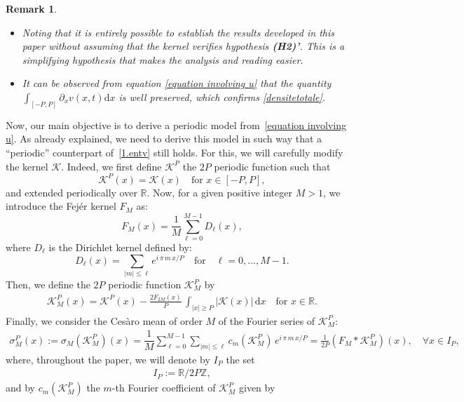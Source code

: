 \documentclass[11pt]{amsart}
\newtheorem{remark}{Remark}
\newcommand{\K}{\mathcal{K}}
\newcommand{\dd}{\mathrm{d}}
\newcommand{\R}{\mathbb{R}}
\newcommand{\Z}{\mathbb{Z}}
\begin{document}
\begin{remark}{$\;$}

\begin{itemize}
\item Noting that it is entirely possible to establish the results developed in this paper without assuming that the kernel verifies hypothesis {\textbf{(H2)'}}. This is a simplifying hypothesis that makes the analysis and reading easier.
\item  It can be observed from equation \eqref{equation involving u} 
 that the quantity $\int_{[-P,P]}  \partial_x v(x,t) \dd x$  is well preserved, 
which confirms  \eqref{densitetotale}.
\end{itemize}
\end{remark}
Now, our main objective is to derive a periodic model from~\eqref{equation involving u}. As already explained, we need to derive this model in such way that a ``periodic'' counterpart of~\eqref{1.entv} still holds. For this, we will carefully modify the kernel $\K$. Indeed, we first define $\K^P$ the $2P$ periodic function such that 
\[
\K^P(x) = \K(x) \quad \mbox{for }x \in [-P,P],
\]
and extended periodically over $\R$. Now, for a given positive integer $M>1$, 
we introduce  the Fej\'er kernel $F_M$ as: 
 \begin{equation}\label{Fejer kernel}
      F_M(x)= \frac{1}{M} \sum_{\ell = 0}^{M - 1}  D_{\ell}(x),  
  \end{equation}
 where $D_\ell$ is the Dirichlet  kernel  defined by: 
   $$
 D_\ell(x)=  \sum_{|m|\leq \ell} e^{i \,\pi \, m \,x/P}
      \quad\mbox{for} \quad    \ell = 0, \ldots, M-1.
 $$
Then, we define the $2P$ periodic function $\K^P_M$ by
\begin{align}\label{1.defKP}
    \K^P_M(x) = \K^P(x) - \frac{2F_{2M}(x)}{P} \, \int_{|x|\geq P} \left|\K(x)\right| \, \dd x \quad \mbox{for }x \in \R. 
\end{align}
Finally, we consider the  Ces\`aro mean of order $M$ 
 of the Fourier series of $\K^P_M$:
 \begin{align}\label{cesaro}
     \sigma_M^P(x) := \sigma_M(\K^P_{M})(x) = \dfrac{1}{M} \sum_{\ell=0}^{M-1} \sum_{|m|\leq \ell} c_m(\K^P_{M}) \, e^{i \,\pi \,m \, x/P} = \frac{1}{2P} \left(F_M \ast \K^P_{M}\right)(x), \quad \forall x \in I_P,
 \end{align}
 where, throughout the paper, we will denote by $I_P$ the set
 \begin{align}\label{defI}
     I_P := \R/2P\Z,
 \end{align} 
 and by $c_m(\K^P_M)$  the $m$-th Fourier coefficient of $\K^P_M$ given by
\end{document}
